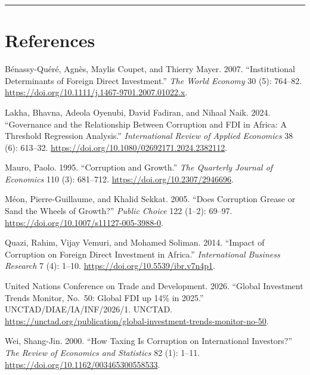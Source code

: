 \documentclass[
  12pt,
  letterpaper,
  DIV=11,
  numbers=noendperiod]{scrartcl}
\newlength{\cslhangindent}
\newenvironment{CSLReferences}[2] %
 {\begin{list}{}{%
  \setlength{\itemindent}{0pt}
  \setlength{\leftmargin}{0pt}
  \setlength{\parsep}{0pt}
  \ifodd #1
   \setlength{\leftmargin}{\cslhangindent}
   \setlength{\itemindent}{-1\cslhangindent}
  \fi
  \setlength{\itemsep}{#2\baselineskip}}}
 {\end{list}}
\begin{document}
\begin{center}\rule{0.5\linewidth}{0.5pt}\end{center}

\section*{References}\label{references}

\label{refs}
\begin{CSLReferences}{1}{0}
Bénassy-Quéré, Agnès, Maylis Coupet, and Thierry Mayer. 2007.
{``Institutional Determinants of Foreign Direct Investment.''} \emph{The
World Economy} 30 (5): 764--82.
\url{https://doi.org/10.1111/j.1467-9701.2007.01022.x}.

Lakha, Bhavna, Adeola Oyenubi, David Fadiran, and Nihaal Naik. 2024.
{``Governance and the Relationship Between Corruption and {FDI} in
{Africa}: A Threshold Regression Analysis.''} \emph{International Review
of Applied Economics} 38 (6): 613--32.
\url{https://doi.org/10.1080/02692171.2024.2382112}.

Mauro, Paolo. 1995. {``Corruption and Growth.''} \emph{The Quarterly
Journal of Economics} 110 (3): 681--712.
\url{https://doi.org/10.2307/2946696}.

Méon, Pierre-Guillaume, and Khalid Sekkat. 2005. {``Does Corruption
Grease or Sand the Wheels of Growth?''} \emph{Public Choice} 122 (1--2):
69--97. \url{https://doi.org/10.1007/s11127-005-3988-0}.

Quazi, Rahim, Vijay Vemuri, and Mohamed Soliman. 2014. {``Impact of
Corruption on Foreign Direct Investment in {Africa}.''}
\emph{International Business Research} 7 (4): 1--10.
\url{https://doi.org/10.5539/ibr.v7n4p1}.

United Nations Conference on Trade and Development. 2026. {``Global
Investment Trends Monitor, No.~50: Global {FDI} up 14\% in 2025.''}
UNCTAD/DIAE/IA/INF/2026/1. UNCTAD.
\url{https://unctad.org/publication/global-investment-trends-monitor-no-50}.

Wei, Shang-Jin. 2000. {``How Taxing Is Corruption on International
Investors?''} \emph{The Review of Economics and Statistics} 82 (1):
1--11. \url{https://doi.org/10.1162/003465300558533}.

\end{CSLReferences}
\end{document}
